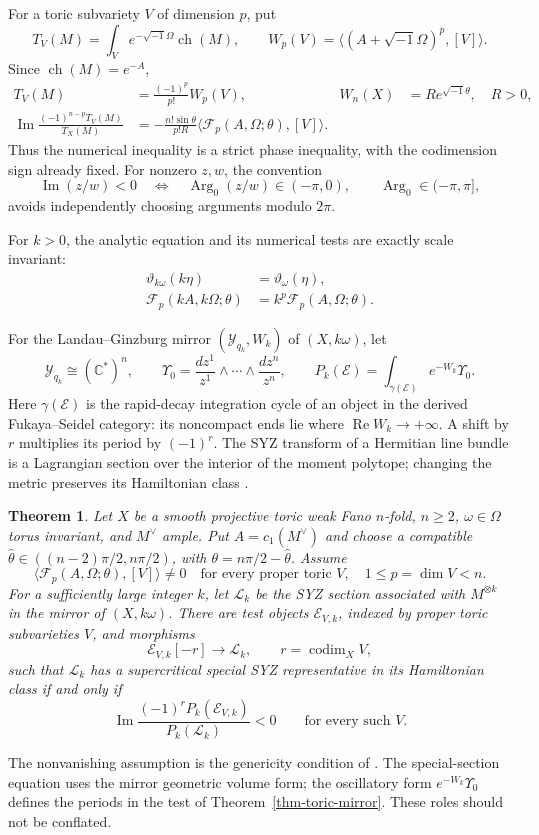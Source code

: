 \documentclass[12pt,reqno]{amsart}
\numberwithin{equation}{section}
\theoremstyle{plain}
\newcommand{\recallheading}{Theorem}
\newtheorem*{recalledtheorem}{\recallheading}
\newenvironment{theoremrecall}[1]{%
 \renewcommand{\recallheading}{Theorem~\ref{#1} (recalled)}%
 \begin{recalledtheorem}%
}{\end{recalledtheorem}}
\theoremstyle{definition}
\newcommand{\cF}{\mathcal F}
\newcommand{\C}{\mathbb C}
\newcommand{\ToricMirrorStatement}{%
Let $X$ be a smooth projective toric weak Fano $n$-fold, $n\geq2$,
$\omega\in\Omega$ torus invariant, and $M^\vee$ ample. Put
$A=c_1(M^\vee)$ and choose a compatible
$\widehat\theta\in((n-2)\pi/2,n\pi/2)$, with
$\theta=n\pi/2-\widehat\theta$. Assume
\[
 \langle\cF_p(A,\Omega;\theta),[V]\rangle\ne0
 \quad\text{for every proper toric }V,
 \quad 1\leq p=\dim V<n.
\]
For a sufficiently large integer $k$, let $\mathcal L_k$ be the SYZ
section associated with $M^{\otimes k}$ in the mirror of $(X,k\omega)$.
There are test objects $\mathcal E_{V,k}$, indexed by proper toric
subvarieties $V$, and morphisms
\[
 \mathcal E_{V,k}[-r]\longrightarrow\mathcal L_k,
 \qquad r=\operatorname{codim}_X V,
\]
such that $\mathcal L_k$ has a supercritical special SYZ representative
in its Hamiltonian class if and only if
\[
 \operatorname{Im}\frac{(-1)^rP_k(\mathcal E_{V,k})}
                          {P_k(\mathcal L_k)}<0
 \qquad\text{for every such }V.
\]
}
\begin{document}
For a toric subvariety $V$ of dimension $p$, put
\[
 T_V(M)=\int_V e^{-\sqrt{-1}\Omega}\operatorname{ch}(M),\qquad
 W_p(V)=\langle(A+\sqrt{-1}\Omega)^p,[V]\rangle.
\]
Since $\operatorname{ch}(M)=e^{-A}$,
\begin{align}
 T_V(M)&=\frac{(-1)^p}{p!}W_p(V),&
 W_n(X)&=R e^{\sqrt{-1}\theta},\quad R>0,\nonumber\\
 \operatorname{Im}\frac{(-1)^{n-p}T_V(M)}{T_X(M)}
 &=-\frac{n!\sin\theta}{p!R}
   \langle\cF_p(A,\Omega;\theta),[V]\rangle.
 \label{numerical-to-phase-ratio}
\end{align}
Thus the numerical inequality is a strict phase inequality, with the
codimension sign already fixed. For nonzero $z,w$, the convention
\[
 \operatorname{Im}(z/w)<0
 \quad\Longleftrightarrow\quad
 \operatorname{Arg}_0(z/w)\in(-\pi,0),
 \qquad\operatorname{Arg}_0\in(-\pi,\pi],
\]
avoids independently choosing arguments modulo $2\pi$.

For $k>0$, the analytic equation and its numerical tests are exactly scale invariant:
\begin{align}
 \vartheta_{k\omega}(k\eta)&=\vartheta_\omega(\eta),\nonumber\\
 \cF_p(kA,k\Omega;\theta)&=k^p\cF_p(A,\Omega;\theta).
 \label{toric-simultaneous-scaling}
\end{align}

For the Landau--Ginzburg mirror $(\mathcal Y_{q_k},W_k)$ of
$(X,k\omega)$, let
\[
 \mathcal Y_{q_k}\cong(\C^*)^n,\qquad
 \Upsilon_0=\frac{dz^1}{z^1}\wedge\cdots\wedge\frac{dz^n}{z^n},
 \qquad
 P_k(\mathcal E)=\int_{\gamma(\mathcal E)}e^{-W_k}\Upsilon_0.
\]
Here $\gamma(\mathcal E)$ is the rapid-decay integration cycle of an
object in the derived Fukaya--Seidel category: its noncompact ends lie
where $\operatorname{Re}W_k\to+\infty$. A shift by $r$ multiplies its
period by $(-1)^r$. The SYZ transform of a Hermitian line bundle is a
Lagrangian section over the interior of the moment polytope; changing
the metric preserves its Hamiltonian class
\cite[Section 1.1]{Sto25}.

\begin{theoremrecall}{thm-toric-mirror}
\ToricMirrorStatement
\end{theoremrecall}
The nonvanishing assumption is the genericity condition of
\cite[Remark 2.6(v)]{Sto25}. The special-section equation uses the
mirror geometric volume form; the oscillatory form
$e^{-W_k}\Upsilon_0$ defines the periods in the test of
Theorem~\ref{thm-toric-mirror}. These roles should not be conflated.
\end{document}
